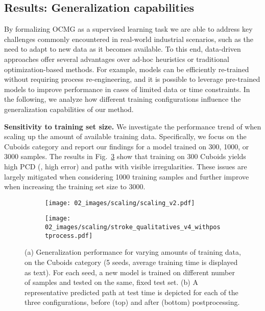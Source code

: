 \subsection{Results: Generalization capabilities}
\label{sec:results_generalization}
By formalizing OCMG as a supervised learning task we are able to address key challenges commonly encountered in real-world industrial scenarios, such as the need to adapt to new data as it becomes available.
To this end, data-driven approaches offer several advantages over ad-hoc heuristics or traditional optimization-based methods. 
For example, models can be efficiently re-trained without requiring process re-engineering, and it is possible to leverage pre-trained models to improve performance in cases of limited data or time constraints. In the following, we analyze how different training configurations influence the generalization capabilities of our method.

\noindent \textbf{Sensitivity to training set size.}
We investigate the performance trend of \ours when scaling up the amount of available training data. Specifically, we focus on the Cuboids category and report our findings for a model trained on 300, 1000, or 3000 samples.
The results in Fig.~\ref{fig:n_samples_scaling} show that training on 300 Cuboids yields high PCD (\ie, high error) and paths with visible irregularities. These issues are largely mitigated when considering 1000 training samples and further improve when increasing the training set size to 3000. 

\begin{figure}[tb]
\centering
\begin{subfigure}[b]{\linewidth}
   \centering
   \texttt{[image: 02\_images/scaling/scaling\_v2.pdf]}
   \vspace{-4pt}
   \caption{}
   \label{fig:Ng1} 
\end{subfigure}
\begin{subfigure}[b]{\linewidth}
    \centering
   \texttt{[image: 02\_images/scaling/stroke\_qualitatives\_v4\_withpostprocess.pdf]}
   \caption{}
   \label{fig:Ng2}
\end{subfigure}

\caption{(a) Generalization performance for varying amounts of training data, on the Cuboids category (5 seeds, average training time is displayed as text). For each seed, a new model is trained on different number of samples and tested on the same, fixed test set. (b) A representative predicted path at test time is depicted for each of the three configurations, before (top) and after (bottom) postprocessing.}
\label{fig:n_samples_scaling}
\end{figure}

